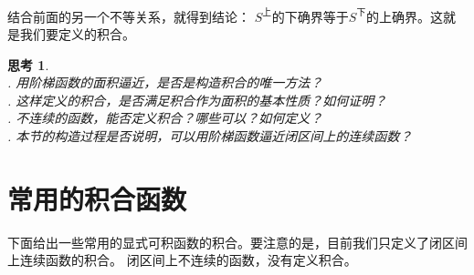 \documentclass[12pt,UTF8]{ctexbook}
\theoremstyle{definition}
\theoremstyle{plain}
\newtheorem{sk}{思考}[section]
\begin{document}
\begin{appendix}
结合前面的另一个不等关系，就得到结论：
$S^{\text{上}}$的下确界等于$S^{\text{下}}$的上确界。这就是我们要定义的积合。

\begin{sk}
    \mbox{} \\
    . 用阶梯函数的面积逼近，是否是构造积合的唯一方法？ \\
    . 这样定义的积合，是否满足积合作为面积的基本性质？如何证明？\\
    . 不连续的函数，能否定义积合？哪些可以？如何定义？\\
    . 本节的构造过程是否说明，可以用阶梯函数逼近闭区间上的连续函数？
\end{sk}

\section{常用的积合函数}

下面给出一些常用的显式可积函数的积合。要注意的是，目前我们只定义了闭区间上连续函数的积合。
闭区间上不连续的函数，没有定义积合。


\end{appendix}
\end{document}
